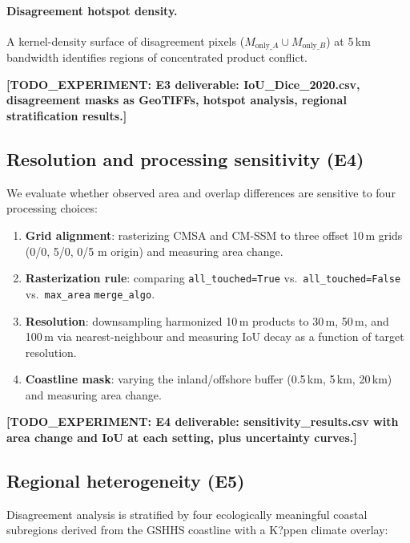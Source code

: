 \documentclass[11pt]{article}
\newcommand{\TODOEXP}[1]{\textcolor{todocolor}{\textbf{[TODO_EXPERIMENT: #1]}}}
\begin{document}
\paragraph{Disagreement hotspot density.}
A kernel-density surface of disagreement pixels ($M_{\text{only}\_A} \cup
M_{\text{only}\_B}$) at 5\,km bandwidth identifies regions of concentrated
product conflict.

\TODOEXP{E3 deliverable: IoU\_Dice\_2020.csv, disagreement masks as GeoTIFFs,
hotspot analysis, regional stratification results.}

\subsection{Resolution and processing sensitivity (E4)}

We evaluate whether observed area and overlap differences are sensitive to
four processing choices:

\begin{enumerate}[nosep]
\item \textbf{Grid alignment}: rasterizing CMSA and CM-SSM to three offset 10\,m
  grids (0/0, 5/0, 0/5 m origin) and measuring area change.
\item \textbf{Rasterization rule}: comparing \texttt{all\_touched=True} vs.\
  \texttt{all\_touched=False} vs.\ \texttt{max\_area} \texttt{merge\_algo}.
\item \textbf{Resolution}: downsampling harmonized 10\,m products to 30\,m,
  50\,m, and 100\,m via nearest-neighbour and measuring IoU decay as a
  function of target resolution.
\item \textbf{Coastline mask}: varying the inland/offshore buffer (0.5\,km,
  5\,km, 20\,km) and measuring area change.
\end{enumerate}

\TODOEXP{E4 deliverable: sensitivity\_results.csv with area change and IoU at each
setting, plus uncertainty curves.}

\subsection{Regional heterogeneity (E5)}

Disagreement analysis is stratified by four ecologically meaningful coastal
subregions derived from the GSHHS coastline with a K?ppen climate overlay:
\end{document}
